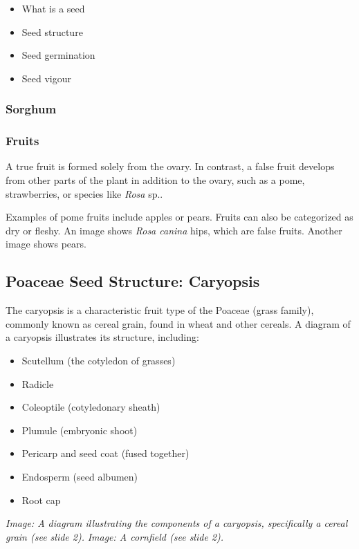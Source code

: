 \begin{itemize} 
    \item What is a seed 
    \item Seed structure 
    \item Seed germination 
    \item Seed vigour 
\end{itemize}

\subsubsection{Sorghum} 
\subsubsection{Fruits} 
A true fruit is formed solely from the ovary. In contrast, a false fruit develops from other parts of the plant in addition to the ovary, such as a pome, strawberries, or species like \textit{Rosa} sp.. 

Examples of pome fruits include apples or pears. Fruits can also be categorized as dry or fleshy. An image shows \textit{Rosa canina} hips, which are false fruits. Another image shows pears.

\subsection{Poaceae Seed Structure: Caryopsis} 
The caryopsis is a characteristic fruit type of the Poaceae (grass family), commonly known as cereal grain, found in wheat and other cereals. A diagram of a caryopsis illustrates its structure, including: 

\begin{itemize} 
    \item Scutellum (the cotyledon of grasses) 
    \item Radicle 
    \item Coleoptile (cotyledonary sheath) 
    \item Plumule (embryonic shoot) 
    \item Pericarp and seed coat (fused together) 
    \item Endosperm (seed albumen) 
    \item Root cap 
\end{itemize} 

\textit{Image: A diagram illustrating the components of a caryopsis, specifically a cereal grain (see slide 2).} \textit{Image: A cornfield (see slide 2).}

